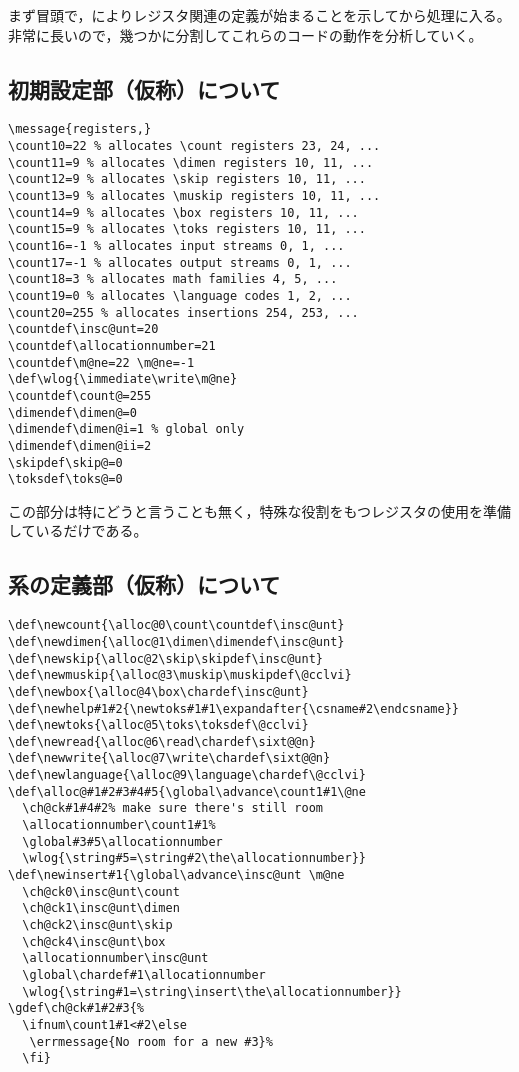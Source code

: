 \documentclass[autodetect-engine,dvipdfmx]{jsarticle}
\begin{document}
まず冒頭で，によりレジスタ関連の定義が始まることを示してから処理に入る。非常に長いので，幾つかに分割してこれらのコードの動作を分析していく。

\subsection{初期設定部（仮称）について}

\begin{lstlisting}[firstnumber=302]
\message{registers,}
\count10=22 % allocates \count registers 23, 24, ...
\count11=9 % allocates \dimen registers 10, 11, ...
\count12=9 % allocates \skip registers 10, 11, ...
\count13=9 % allocates \muskip registers 10, 11, ...
\count14=9 % allocates \box registers 10, 11, ...
\count15=9 % allocates \toks registers 10, 11, ...
\count16=-1 % allocates input streams 0, 1, ...
\count17=-1 % allocates output streams 0, 1, ...
\count18=3 % allocates math families 4, 5, ...
\count19=0 % allocates \language codes 1, 2, ...
\count20=255 % allocates insertions 254, 253, ...
\countdef\insc@unt=20
\countdef\allocationnumber=21
\countdef\m@ne=22 \m@ne=-1
\def\wlog{\immediate\write\m@ne}
\countdef\count@=255
\dimendef\dimen@=0
\dimendef\dimen@i=1 % global only
\dimendef\dimen@ii=2
\skipdef\skip@=0
\toksdef\toks@=0
\end{lstlisting}

この部分は特にどうと言うことも無く，特殊な役割をもつレジスタの使用を準備しているだけである。

\subsection{系の定義部（仮称）について}

\begin{lstlisting}[firstnumber=324]
\def\newcount{\alloc@0\count\countdef\insc@unt}
\def\newdimen{\alloc@1\dimen\dimendef\insc@unt}
\def\newskip{\alloc@2\skip\skipdef\insc@unt}
\def\newmuskip{\alloc@3\muskip\muskipdef\@cclvi}
\def\newbox{\alloc@4\box\chardef\insc@unt}
\def\newhelp#1#2{\newtoks#1#1\expandafter{\csname#2\endcsname}}
\def\newtoks{\alloc@5\toks\toksdef\@cclvi}
\def\newread{\alloc@6\read\chardef\sixt@@n}
\def\newwrite{\alloc@7\write\chardef\sixt@@n}
\def\newlanguage{\alloc@9\language\chardef\@cclvi}
\def\alloc@#1#2#3#4#5{\global\advance\count1#1\@ne
  \ch@ck#1#4#2% make sure there's still room
  \allocationnumber\count1#1%
  \global#3#5\allocationnumber
  \wlog{\string#5=\string#2\the\allocationnumber}}
\def\newinsert#1{\global\advance\insc@unt \m@ne
  \ch@ck0\insc@unt\count
  \ch@ck1\insc@unt\dimen
  \ch@ck2\insc@unt\skip
  \ch@ck4\insc@unt\box
  \allocationnumber\insc@unt
  \global\chardef#1\allocationnumber
  \wlog{\string#1=\string\insert\the\allocationnumber}}
\gdef\ch@ck#1#2#3{%
  \ifnum\count1#1<#2\else
   \errmessage{No room for a new #3}%
  \fi}
\end{lstlisting}
\end{document}
